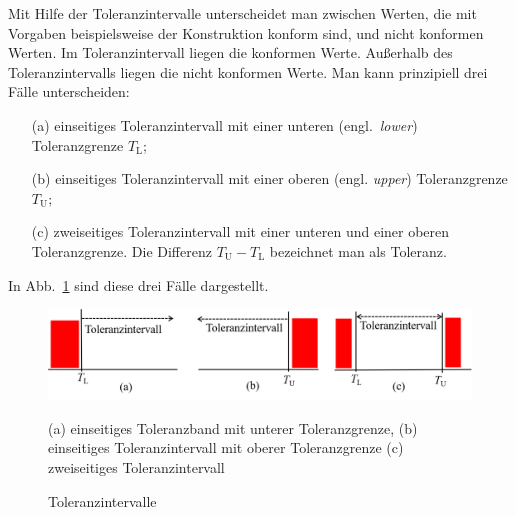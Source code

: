 Mit Hilfe der Toleranzintervalle unterscheidet man zwischen Werten, die mit
Vorgaben beispielsweise der Konstruktion konform sind, und nicht konformen Werten.
Im Toleranzintervall liegen die konformen Werte. Außerhalb des Toleranzintervalls liegen die nicht konformen Werte. Man kann prinzipiell drei Fälle unterscheiden:
\begin{itemize}
\item[(a)] einseitiges Toleranzintervall mit einer unteren (engl.\ \textsl{lower}) Toleranzgrenze $T_\mathrm{L}$;
\item[(b)] einseitiges Toleranzintervall mit einer oberen (engl. \textsl{upper}) Toleranzgrenze $T_\mathrm{U}$; \item[(c)] zweiseitiges Toleranzintervall mit einer unteren und einer oberen Toleranzgrenze. Die Differenz $T_\mathrm{U} - T_\mathrm{L}$ bezeichnet man als Toleranz.
\end{itemize}
In Abb.~\ref{fig:Toleranzintervalle} sind diese drei Fälle dargestellt.

\begin{figure} %
	\begin{center}
		\includegraphics[width=130mm]{05_vorlesung/media/Toleranzintervalle.png}
		\caption{\label{fig:Toleranzintervalle}	Toleranzintervalle} (a) einseitiges Toleranzband mit unterer Toleranzgrenze, (b) einseitiges Toleranzintervall mit oberer Toleranzgrenze (c) zweiseitiges Toleranzintervall
	\end{center}
\end{figure}

